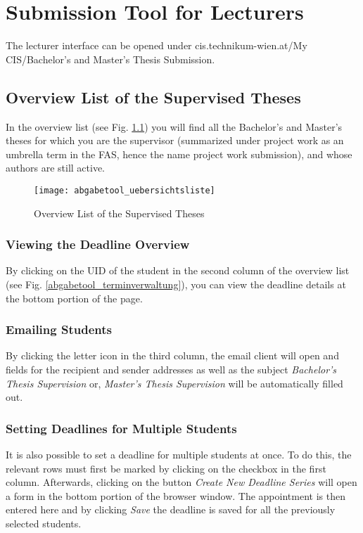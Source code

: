 \chapter{Submission Tool for Lecturers}
\label{Kapitel Aufruf}
The lecturer interface can be opened under cis.technikum-wien.at/My CIS/Bachelor's and Master's Thesis Submission.

\section{Overview List of the Supervised Theses}
In the overview list (see Fig. \ref{abgabetool_uebersichtsliste}) you will find all the Bachelor's and Master's theses for which you are the supervisor (summarized under project work as an umbrella term in the FAS, hence the name project work submission), and whose authors are still active.

\begin {figure}
	\centering
	\texttt{[image: abgabetool\_uebersichtsliste]}
	\caption{Overview List of the Supervised Theses}
	\label{abgabetool_uebersichtsliste}
\end {figure}

\subsection{Viewing the Deadline Overview}
By clicking on the UID of the student in the second column of the overview list (see Fig. \ref{abgabetool_terminverwaltung}), you can view the deadline details at the bottom portion of the page.

\subsection{Emailing Students}
By clicking the letter icon in the third column, the email client will open and fields for the recipient and sender addresses as well as the subject \textit{Bachelor's Thesis Supervision} or, \textit{Master's Thesis Supervision} will be automatically filled out.

\subsection{Setting Deadlines for Multiple Students}
It is also possible to set a deadline for multiple students at once. To do this, the relevant rows must first be marked by clicking on the checkbox in the first column. Afterwards, clicking on the button \textit{Create New Deadline Series} will open a form in the bottom portion of the browser window. The appointment is then entered here and by clicking \textit{Save} the deadline is saved for all the previously selected students.

